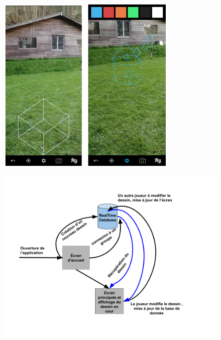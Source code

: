\documentclass[12pt]{article}
\begin{document}
\begin{center}		\includegraphics[width=0.65\textwidth]{Capture3.png}
\end{center}

\begin{center}		\includegraphics[width=0.85\textwidth]{dessin2.png}
\end{center}
\end{document}

